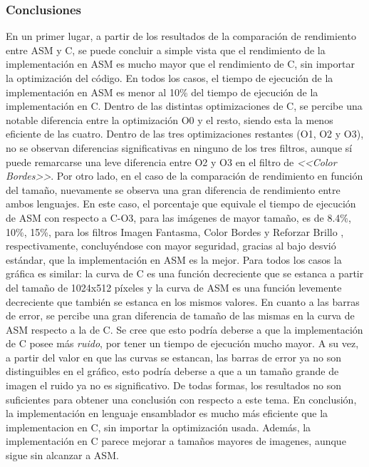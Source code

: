 \documentclass[a4paper]{article}
\begin{document}
\subsubsection{Conclusiones}
\justify 
En un primer lugar, a partir de los resultados de la comparación de rendimiento entre ASM y C, se puede concluir a simple vista que el rendimiento de la implementación en ASM es mucho mayor que el rendimiento de C, sin importar la optimización del código. En todos los casos, el tiempo de ejecución de la implementación en ASM es menor al 10\% del tiempo de ejecución de la implementación en C. Dentro de las distintas optimizaciones de C, se percibe una notable diferencia entre la optimización O0 y el resto, siendo esta la menos eficiente de las cuatro. Dentro de las tres optimizaciones restantes (O1, O2 y O3), no se observan diferencias significativas en ninguno de los tres filtros, aunque sí puede remarcarse una leve diferencia entre O2 y O3 en el filtro de \textit{<<Color Bordes>>}.
\justify 
Por otro lado, en el caso de la comparación de rendimiento en función del tamaño, nuevamente se observa una gran diferencia de rendimiento entre ambos lenguajes. En este caso, el porcentaje que equivale el tiempo de ejecución de ASM con respecto a C-O3, para las imágenes de mayor tamaño, es de 8.4\%, 10\%, 15\%, para los filtros Imagen Fantasma, Color Bordes y Reforzar Brillo , respectivamente, concluyéndose con mayor seguridad, gracias al bajo desvió estándar, que la implementación en ASM es la mejor. Para todos los casos la gráfica es similar: la curva de C es una función decreciente que se estanca a partir del tamaño de 1024x512 píxeles y la curva de ASM es una función levemente decreciente que también se estanca en los mismos valores. En cuanto a las barras de error, se percibe una gran diferencia de tamaño de las mismas en la curva de ASM respecto a la de C. Se cree que esto podría deberse a que la implementación de C posee más \textit{ruido}, por tener un tiempo de ejecución mucho mayor. A su vez, a partir del valor en que las curvas se estancan, las barras de error ya no son distinguibles en el gráfico, esto podría deberse a que a un tamaño grande de imagen el ruido ya no es significativo. De todas formas, los resultados no son suficientes para obtener una conclusión con respecto a este tema.
\justify En conclusión, la implementación en lenguaje ensamblador es mucho más eficiente que la implementacion en C, sin importar la optimización usada. Además, la implementación en C parece mejorar a tamaños mayores de imagenes, aunque sigue sin alcanzar a ASM.
\end{document}
